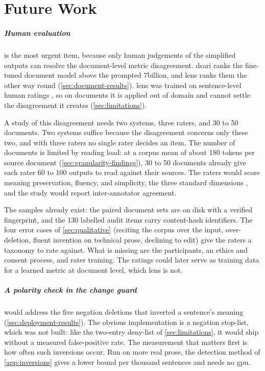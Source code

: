 \chapter{Future Work}
\label{sec:future-work}

\paragraph{Human evaluation} is the most urgent item, because only human judgements of the simplified outputs can resolve the document-level metric disagreement.
\Gls{dsari} ranks the fine-tuned document model above the prompted 7\gls{billion}, and \gls{lens} ranks them the other way round (\cref{sec:document-results}).
\Gls{lens} was trained on sentence-level human ratings \parencite[16385--16386]{maddela-etal-2023-lens}, so on documents it is applied out of domain and cannot settle the disagreement it creates (\cref{sec:limitations}).

A study of this disagreement needs two systems, three raters, and 30 to 50 documents.
Two systems suffice because the disagreement concerns only these two, and with three raters no single rater decides an item.
The number of documents is limited by reading load: at a corpus mean of about 180 tokens per source document (\cref{sec:granularity-findings}), 30 to 50 documents already give each rater 60 to 100 outputs to read against their sources.
The raters would score meaning preservation, fluency, and simplicity, the three standard dimensions \parencite[147]{alva-manchego-etal-2020-survey}, and the study would report inter-annotator agreement.

The samples already exist: the paired document sets are on disk with a verified fingerprint, and the \num{130} labelled audit items carry content-hash identifiers.
The four error cases of \cref{sec:qualitative} (reciting the corpus over the input, over-deletion, fluent invention on technical prose, declining to edit) give the raters a taxonomy to rate against.
What is missing are the participants, an ethics and consent process, and rater training.
The ratings could later serve as training data for a learned metric at document level, which \gls{lens} is not.

\paragraph{A polarity check in the change guard} would address the five negation deletions that inverted a sentence's meaning (\cref{sec:deployment-results}).
The obvious implementation is a negation stop-list, which was not built: like the two-entry deny-list of \cref{sec:limitations}, it would ship without a measured false-positive rate.
The measurement that matters first is how often such inversions occur.
Run on more real prose, the detection method of \cref{app:inversions} gives a lower bound per thousand sentences and needs no \gls{gpu}.

